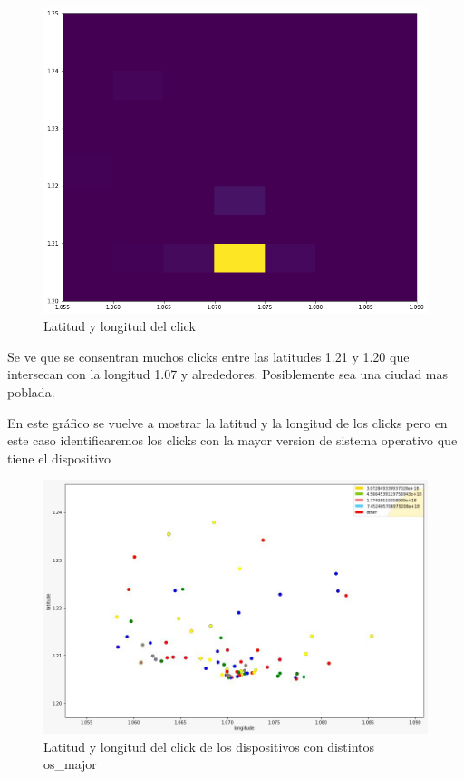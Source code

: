 \documentclass[a4paper, 12pt]{article}
\newcommand\tab[1][1cm]{\hspace*{#1}}
\begin{document}
		\FloatBarrier
		\begin{figure}[h]
			\centering
			\includegraphics[width=\textwidth]{images/clicks/clicks_lat_long_heat.png}
			\caption{Latitud y longitud del click}
		\end{figure}
		\FloatBarrier


		\tab Se ve que se consentran muchos clicks entre las latitudes 1.21 y 1.20 que intersecan con la longitud 1.07 y alrededores. Posiblemente sea una ciudad mas poblada.

		
		\tab En este gráfico se vuelve a mostrar la latitud y la longitud de los clicks pero en este caso identificaremos los clicks con la mayor version de sistema operativo que tiene el dispositivo
		
		\FloatBarrier
		\begin{figure}[h]
			\centering
			\includegraphics[width=\textwidth]{images/clicks/clicks_lat_long_major_OS.png}
			\caption{Latitud y longitud del click de los dispositivos con distintos os\_major}
		\end{figure}
		\FloatBarrier
\end{document}
